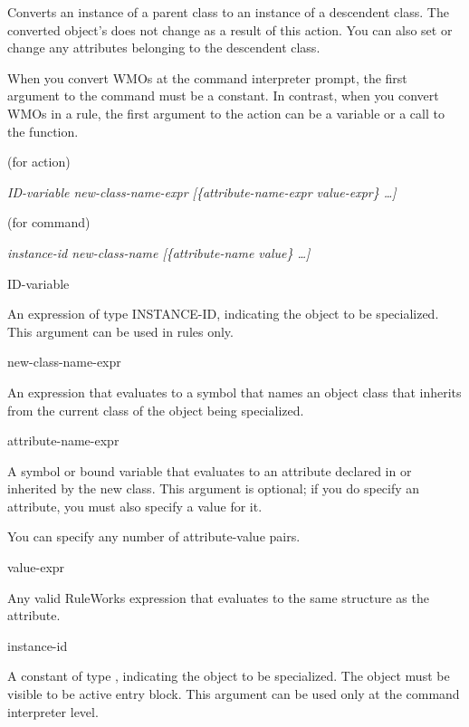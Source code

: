 {{Converts an instance of a parent class to an instance of a descendent
class. The converted object's  does not change as a
result of this action. You can also set or change any attributes
belonging to the descendent class.

\begin{note}
  When you convert WMOs at the command interpreter prompt, the first
  argument to the  command must be a constant. In
  contrast, when you convert WMOs in a rule, the first argument to the
   action can be a variable or a call to the 
  function.
\end{note}

\Format (for action)

 \it{ID-variable} \it{new-class-name-expr}
[\{\it{attribute-name-expr} \it{value-expr}\} \ldots]

\Format (for command)

 \it{instance-id} \it{new-class-name}
[\{\it{attribute-name} \it{value}\} \ldots]

\begin{arguments}
\item[ID-variable]

  An expression of type INSTANCE-ID, indicating the object to be
  specialized. This argument can be used in rules only.

\item[new-class-name-expr]

  An expression that evaluates to a symbol that names an object class
  that inherits from the current class of the object being
  specialized.

\item[attribute-name-expr]

  A symbol or bound variable that evaluates to an attribute declared
  in or inherited by the new class. This argument is optional; if you
  do specify an attribute, you must also specify a value for it.

  You can specify any number of attribute-value pairs.

\item[value-expr]

  Any valid RuleWorks expression that evaluates to the same structure
  as the attribute.

\item[instance-id]

  A constant of type , indicating the object to be
  specialized. The object must be visible to be active entry
  block. This argument can be used only at the command interpreter
  level.


\end{arguments}}}
